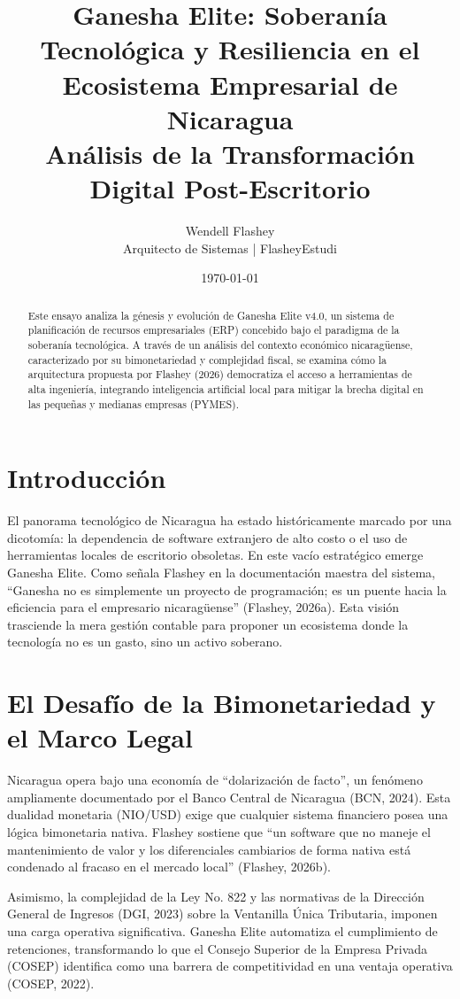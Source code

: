\documentclass[12pt, a4paper]{article}
\title{
    \textbf{\huge Ganesha Elite: Soberanía Tecnológica y Resiliencia en el Ecosistema Empresarial de Nicaragua}\\[0.5cm]
    \large Análisis de la Transformación Digital Post-Escritorio
}
\author{Wendell Flashey \\ \small Arquitecto de Sistemas | FlasheyEstudi}
\date{\today}
\begin{document}
\maketitle

\begin{abstract}
    Este ensayo analiza la génesis y evolución de Ganesha Elite v4.0, un sistema de planificación de recursos empresariales (ERP) concebido bajo el paradigma de la soberanía tecnológica. A través de un análisis del contexto económico nicaragüense, caracterizado por su bimonetariedad y complejidad fiscal, se examina cómo la arquitectura propuesta por Flashey (2026) democratiza el acceso a herramientas de alta ingeniería, integrando inteligencia artificial local para mitigar la brecha digital en las pequeñas y medianas empresas (PYMES).
\end{abstract}

\section{Introducción}
El panorama tecnológico de Nicaragua ha estado históricamente marcado por una dicotomía: la dependencia de software extranjero de alto costo o el uso de herramientas locales de escritorio obsoletas. En este vacío estratégico emerge Ganesha Elite. Como señala Flashey en la documentación maestra del sistema, \enquote{Ganesha no es simplemente un proyecto de programación; es un puente hacia la eficiencia para el empresario nicaragüense} (Flashey, 2026a). Esta visión trasciende la mera gestión contable para proponer un ecosistema donde la tecnología no es un gasto, sino un activo soberano.

\section{El Desafío de la Bimonetariedad y el Marco Legal}
Nicaragua opera bajo una economía de \enquote{dolarización de facto}, un fenómeno ampliamente documentado por el Banco Central de Nicaragua (BCN, 2024). Esta dualidad monetaria (NIO/USD) exige que cualquier sistema financiero posea una lógica bimonetaria nativa. Flashey sostiene que \enquote{un software que no maneje el mantenimiento de valor y los diferenciales cambiarios de forma nativa está condenado al fracaso en el mercado local} (Flashey, 2026b).

Asimismo, la complejidad de la Ley No. 822 y las normativas de la Dirección General de Ingresos (DGI, 2023) sobre la Ventanilla Única Tributaria, imponen una carga operativa significativa. Ganesha Elite automatiza el cumplimiento de retenciones, transformando lo que el Consejo Superior de la Empresa Privada (COSEP) identifica como una barrera de competitividad en una ventaja operativa (COSEP, 2022).
\end{document}

